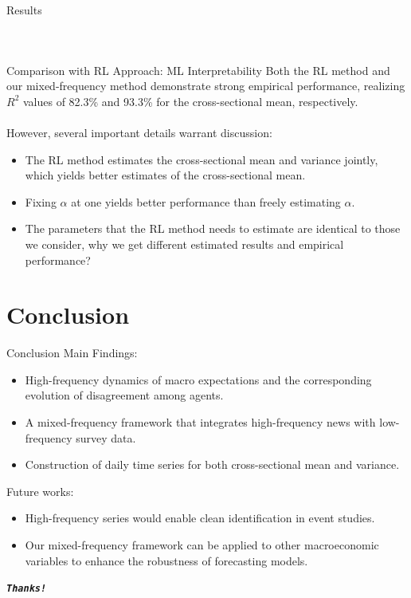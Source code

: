 \documentclass[UTF8, 10pt]{beamer}
\begin{document}
\begin{CJK*}{UTF8}{gbsn}
\begin{frame}{Results}
\begin{columns}
\begin{figure}[htpb]
		\end{figure}
	\end{columns}
\end{frame}
\begin{frame}{Comparison with RL Approach: ML Interpretability}
	Both the RL method and our mixed-frequency method demonstrate strong empirical performance, realizing $R^2$ values of 82.3\% and 93.3\% for the cross-sectional mean, respectively.
	\\\ \\
	However, several important details warrant discussion:
	\begin{itemize}
		\item The RL method estimates the cross-sectional mean and variance jointly, which yields better estimates of the cross-sectional mean.
		\item Fixing $\alpha$ at one yields better performance than freely estimating $\alpha$.
		\item The parameters that the RL method needs to estimate are identical to those we consider, why we get different estimated results and empirical performance?
	\end{itemize}
\end{frame}

\section{Conclusion}
\begin{frame}{Conclusion}
	Main Findings:
	\begin{itemize}
		\item High-frequency dynamics of macro expectations and the corresponding evolution of disagreement among agents.
		\item A mixed-frequency framework that integrates high-frequency news with low-frequency survey data.
		\item Construction of daily time series for both cross-sectional mean and variance.
	\end{itemize}
	Future works:
	\begin{itemize}
		\item High-frequency series would enable clean identification in event studies.
		\item Our mixed-frequency framework can be applied to other macroeconomic variables to enhance the robustness of forecasting models.
	\end{itemize}
\end{frame}
\begin{frame}[allowframebreaks]%
	\begin{center}
		\Huge\textbf{\textit{\texttt{Thanks!}}}
	\end{center}
\end{frame}


\end{CJK*}
\end{document}
